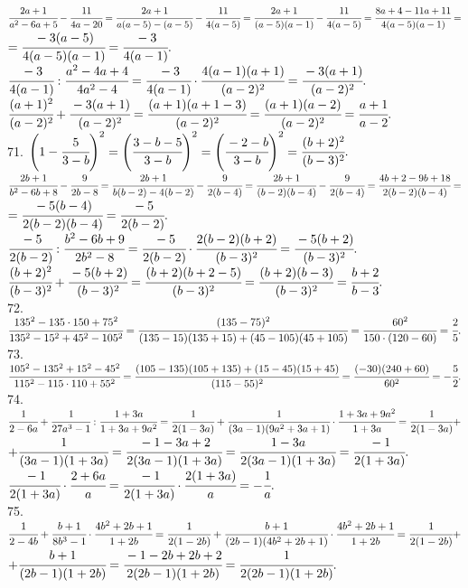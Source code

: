 \documentclass[12pt]{article}
\begin{document}
$\cfrac{2a+1}{a^2-6a+5}-\cfrac{11}{4a-20}=\cfrac{2a+1}{a(a-5)-(a-5)}-\cfrac{11}{4(a-5)}=\cfrac{2a+1}{(a-5)(a-1)}-\cfrac{11}{4(a-5)}=
\cfrac{8a+4-11a+11}{4(a-5)(a-1)}=$\\$=\cfrac{-3(a-5)}{4(a-5)(a-1)}=\cfrac{-3}{4(a-1)}.$\\
$\cfrac{-3}{4(a-1)}:\cfrac{a^2-4a+4}{4a^2-4}=\cfrac{-3}{4(a-1)}\cdot\cfrac{4(a-1)(a+1)}{(a-2)^2}=\cfrac{-3(a+1)}{(a-2)^2}.$\\
$\cfrac{(a+1)^2}{(a-2)^2}+\cfrac{-3(a+1)}{(a-2)^2}=\cfrac{(a+1)(a+1-3)}{(a-2)^2}=\cfrac{(a+1)(a-2)}{(a-2)^2}=\cfrac{a+1}{a-2}.$\\
71. $\left(1-\cfrac{5}{3-b}\right)^2=\left(\cfrac{3-b-5}{3-b}\right)^2=\left(\cfrac{-2-b}{3-b}\right)^2=\cfrac{(b+2)^2}{(b-3)^2}.$\\
$\cfrac{2b+1}{b^2-6b+8}-\cfrac{9}{2b-8}=\cfrac{2b+1}{b(b-2)-4(b-2)}-\cfrac{9}{2(b-4)}=\cfrac{2b+1}{(b-2)(b-4)}-\cfrac{9}{2(b-4)}=
\cfrac{4b+2-9b+18}{2(b-2)(b-4)}=$\\$=\cfrac{-5(b-4)}{2(b-2)(b-4)}=\cfrac{-5}{2(b-2)}.$\\
$\cfrac{-5}{2(b-2)}:\cfrac{b^2-6b+9}{2b^2-8}=\cfrac{-5}{2(b-2)}\cdot\cfrac{2(b-2)(b+2)}{(b-3)^2}=\cfrac{-5(b+2)}{(b-3)^2}.$\\
$\cfrac{(b+2)^2}{(b-3)^2}+\cfrac{-5(b+2)}{(b-3)^2}=\cfrac{(b+2)(b+2-5)}{(b-3)^2}=\cfrac{(b+2)(b-3)}{(b-3)^2}=\cfrac{b+2}{b-3}.$\\
72. $\cfrac{135^2-135\cdot150+75^2}{135^2-15^2+45^2-105^2}=\cfrac{(135-75)^2}{(135-15)(135+15)+(45-105)(45+105)}=
\cfrac{60^2}{150\cdot(120-60)}=\cfrac{2}{5}.$\\
73. $\cfrac{105^2-135^2+15^2-45^2}{115^2-115\cdot110+55^2}=\cfrac{(105-135)(105+135)+(15-45)(15+45)}{(115-55)^2}=
\cfrac{(-30)(240+60)}{60^2}=-\cfrac{5}{2}.$\\
74. $\cfrac{1}{2-6a}+\cfrac{1}{27a^3-1}:\cfrac{1+3a}{1+3a+9a^2}=\cfrac{1}{2(1-3a)}+\cfrac{1}{(3a-1)(9a^2+3a+1)}\cdot\cfrac{1+3a+9a^2}{1+3a}=
\cfrac{1}{2(1-3a)}+$\\$+\cfrac{1}{(3a-1)(1+3a)}=\cfrac{-1-3a+2}{2(3a-1)(1+3a)}=\cfrac{1-3a}{2(3a-1)(1+3a)}=\cfrac{-1}{2(1+3a)}.$\\
$\cfrac{-1}{2(1+3a)}\cdot\cfrac{2+6a}{a}=\cfrac{-1}{2(1+3a)}\cdot\cfrac{2(1+3a)}{a}=-\cfrac{1}{a}.$\\
75. $\cfrac{1}{2-4b}+\cfrac{b+1}{8b^3-1}\cdot\cfrac{4b^2+2b+1}{1+2b}=\cfrac{1}{2(1-2b)}+\cfrac{b+1}{(2b-1)(4b^2+2b+1)}\cdot\cfrac{4b^2+2b+1}{1+2b}=
\cfrac{1}{2(1-2b)}+$\\$+\cfrac{b+1}{(2b-1)(1+2b)}=\cfrac{-1-2b+2b+2}{2(2b-1)(1+2b)}=\cfrac{1}{2(2b-1)(1+2b)}.$\\
\end{document}
